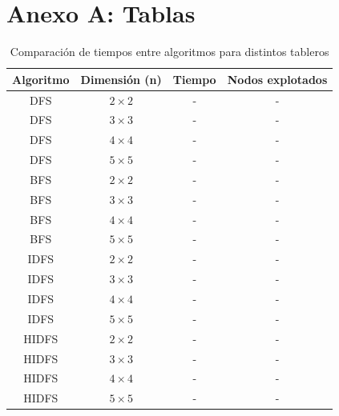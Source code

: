 \documentclass[%
	final,
	reprint,
	notitlepage,
	narroweqnarray,
	inline,
	twoside,
	invited
	]{ieee}
\begin{document}










\clearpage

\onecolumn

\onecolumn
\section*{Anexo A: Tablas}

\begin{table}[H]
\begin{center}
\begin{tabular}{|c|c|c|c|}
\hline
Algoritmo & Dimensión (n) & Tiempo & Nodos explotados\\
\hline
\hline

DFS & $2\times2$ & - & -\\
DFS & $3\times3$ & - & -\\
DFS & $4\times4$ & - & -\\
DFS & $5\times5$ & - & -\\
\hline
BFS & $2\times2$ & - & -\\
BFS & $3\times3$ & - & -\\
BFS & $4\times4$ & - & -\\
BFS & $5\times5$ & - & -\\
\hline
IDFS & $2\times2$ & - & -\\
IDFS & $3\times3$ & - & -\\
IDFS & $4\times4$ & - & -\\
IDFS & $5\times5$ & - & -\\
\hline
HIDFS & $2\times2$ & - & -\\
HIDFS & $3\times3$ & - & -\\
HIDFS & $4\times4$ & - & -\\
HIDFS & $5\times5$ & - & -\\

\hline  
\end{tabular}
\end{center}
\caption{Comparación de tiempos entre algoritmos para distintos tableros}
\label{tabla1}
\end{table}
\end{document}
